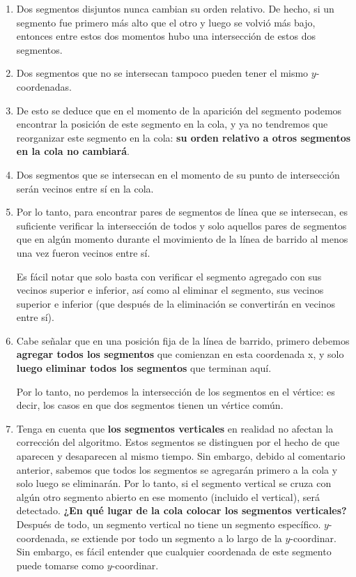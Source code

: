 \begin{enumerate}
	\item Dos segmentos disjuntos nunca cambian su orden relativo. De hecho, si un segmento fue primero más alto que el otro y luego se volvió más bajo, entonces entre estos dos momentos hubo una intersección de estos dos segmentos.
	\item Dos segmentos que no se intersecan tampoco pueden tener el mismo $y$-coordenadas.
	\item De esto se deduce que en el momento de la aparición del segmento podemos encontrar la posición de este segmento en la cola, y ya no tendremos que reorganizar este segmento en la cola: \textbf{su orden relativo a otros segmentos en la cola no cambiará}.
	\item Dos segmentos que se intersecan en el momento de su punto de intersección serán vecinos entre sí en la cola.
	\item Por lo tanto, para encontrar pares de segmentos de línea que se intersecan, es suficiente verificar la intersección de todos y solo aquellos pares de segmentos que en algún momento durante el movimiento de la línea de barrido al menos una vez fueron vecinos entre sí. 
	
	Es fácil notar que solo basta con verificar el segmento agregado con sus vecinos superior e inferior, así como al eliminar el segmento, sus vecinos superior e inferior (que después de la eliminación se convertirán en vecinos entre sí).
	\item Cabe señalar que en una posición fija de la línea de barrido, primero debemos \textbf{agregar todos los segmentos} que comienzan en esta coordenada x, y solo \textbf{luego eliminar todos los segmentos} que terminan aquí. 
	
	Por lo tanto, no perdemos la intersección de los segmentos en el vértice: es decir, los casos en que dos segmentos tienen un vértice común.
	
	\item Tenga en cuenta que \textbf{los segmentos verticales} en realidad no afectan la corrección del algoritmo.
	Estos segmentos se distinguen por el hecho de que aparecen y desaparecen al mismo tiempo. Sin embargo, debido al comentario anterior, sabemos que todos los segmentos se agregarán primero a la cola y solo luego se eliminarán. Por lo tanto, si el segmento vertical se cruza con algún otro segmento abierto en ese momento (incluido el vertical), será detectado.
	\textbf{¿En qué lugar de la cola colocar los segmentos verticales?} Después de todo, un segmento vertical no tiene un segmento específico. $y$-coordenada, se extiende por todo un segmento a lo largo de la $y$-coordinar. Sin embargo, es fácil entender que cualquier coordenada de este segmento puede tomarse como $y$-coordinar.
\end{enumerate}
